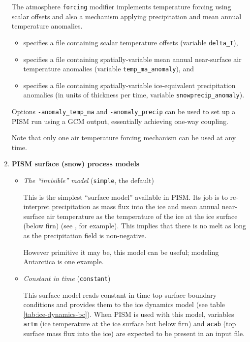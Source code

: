 \begin{enumerate}
  The atmosphere \texttt{forcing} modifier implements temperature forcing using scalar offsets and also a mechanism applying precipitation and mean annual temperature anomalies.
  \begin{itemize}
  \item {} specifies a file containing scalar temperature offsets (variable \texttt{delta_T}), 
  \item {} specifies a file containing spatially-variable mean annual near-surface air temperature anomalies (variable \texttt{temp_ma_anomaly}), and
  \item {} specifies a file containing spatially-variable ice-equivalent precipitation anomalies (in units of thickness per time, variable \texttt{snowprecip_anomaly}).
  \end{itemize}

  Options \texttt{-anomaly_temp_ma} and \texttt{-anomaly_precip} can be used to set up a PISM run using a GCM output, essentially achieving one-way coupling.

  Note that only one air temperature forcing mechanism can be used at any time.

\item \textbf{PISM surface (snow) process models}

\begin{itemize}
  \item \emph{The ``invisible'' model} (\texttt{simple}, the default)

    This is the simplest ``surface model'' available in PISM. Its job is to re-interpret  precipitation as mass flux into the ice and mean annual near-surface air temperature as the temperature of the ice at the ice surface (below firn) (see \cite{Hock05}, for example). This implies that there is no melt as long as the precipitation field  is non-negative.

    However primitive it may be, this model can be useful; modeling Antarctica is one example.
  \item \emph{Constant in time} (\texttt{constant})

    This surface model reads constant in time top surface boundary conditions and provides them to the ice dynamics model (see table \ref{tab:ice-dynamics-bc}). When PISM is used with this model, variables \texttt{artm} (ice temperature at the ice surface but below firn) and \texttt{acab} (top surface mass flux into the ice) are expected to be present in an input file.


\end{itemize}
\end{enumerate}
